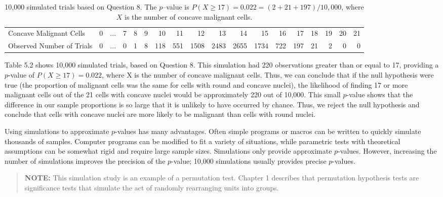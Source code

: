 \documentclass[
]{report}
\begin{document}
\begin{table}

\caption{\label{tab:tab52}10,000 simulated trials based on Question 8. The $p$–value is $P(X\ge17)=0.022=(2+21+197)/10,000$, where $X$ is the number of concave malignant cells.}
\centering
\begin{tabular}[t]{>{\raggedright\arraybackslash}p{2cm}lrrrrrrrrrrrrrrrr}
\toprule
\midrule
Concave Malignant Cells & 0 & ... & 7 & 8 & 9 & 10 & 11 & 12 & 13 & 14 & 15 & 16 & 17 & 18 & 19 & 20 & 21\\
Observed Number of Trials & 0 & ... & 0 & 1 & 8 & 118 & 551 & 1508 & 2483 & 2655 & 1734 & 722 & 197 & 21 & 2 & 0 & 0\\
\bottomrule
\end{tabular}
\end{table}

Table 5.2 shows 10,000 simulated trials, based on Question 8. This simulation had 220 observations greater than or equal to 17, providing a \(\scriptstyle p\)-value of \(P(X \geq 17)= 0.022\), where X is the number of concave
malignant cells. Thus, we can conclude that if the null hypothesis were true (the proportion of malignant cells was the same for cells with round and concave nuclei), the likelihood of finding 17 or more malignant cells out of the 21 cells with concave nuclei would be approximately 220 out of 10,000. This small \(\scriptstyle p\)-value shows
that the difference in our sample proportions is so large that it is unlikely to have occurred by chance. Thus, we reject the null hypothesis and conclude that cells with concave nuclei are more likely to be malignant than cells with round nuclei.

Using simulations to approximate \(\scriptstyle p\)-values has many advantages. Often simple programs or macros can be written to quickly simulate thousands of samples. Computer programs can be modified to fit a variety of situations, while parametric tests with theoretical assumptions can be somewhat rigid and require large sample sizes. Simulations only provide approximate \(\scriptstyle p\)-values. However, increasing the number of simulations improves the precision of the \(\scriptstyle p\)-value; 10,000 simulations usually provides precise \(\scriptstyle p\)-values.

\begin{quote}
\textbf{NOTE:} This simulation study is an example of a permutation test. Chapter 1 describes that permutation hypothesis
tests are significance tests that simulate the act of randomly rearranging units into groups.
\end{quote}
\end{document}
